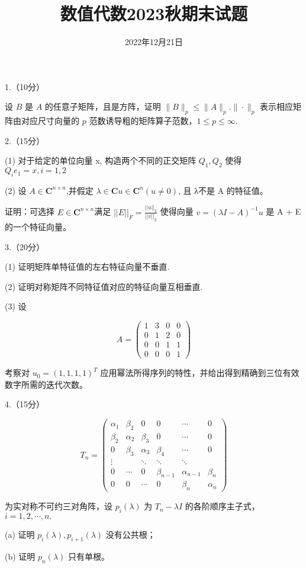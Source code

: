 \documentclass{article}
\title{数值代数2023秋期末试题}
\author{2022年12月21日}
\date{}
\begin{document}
	\maketitle
	
1.（10分）

设 $B$ 是 $A$ 的任意子矩阵，且是方阵，证明 $\|B\|_p\leq\|A\|_p.\|\cdot\|_p$ 表示相应矩阵由对应尺寸向量的 $p$ 范数诱导粗的矩阵算子范数，$1\leq p\leq\infty.$ 

2.（15分）

(1) 对于给定的单位向量 x, 构造两个不同的正交矩阵 $Q_1,Q_2$ 使得 $Q_ie_1=x,i=1,2$ 

(2) 设 $A\in\mathbf{C}^{n\times n}$,并假定 $\lambda\in\mathbf{C}u\in\mathbf{C}^n(u\neq0)$, 且 λ不是 A 的特征值。

证明：可选择 $E\in\mathbf{C}^{n\times n}$满足 $||E||_F=\frac{||u||_2}{||v||_2}$
使得向量 $v=(\lambda I-A)^{-1}u$ 是 A + E 的一个特征向量。


3.（20分）

(1) 证明矩阵单特征值的左右特征向量不垂直.

(2) 证明对称矩阵不同特征值对应的特征向量互相垂直. 

(3) 设

$$\left.A=\left(\begin{array}{cccc}1&3&0&0\\0&1&2&0\\0&0&1&1\\0&0&0&1\end{array}\right.\right)$$

考察对 $u_0=(1,1,1,1)^T$ 应用幂法所得序列的特性，并给出得到精确到三位有效数字所需的迭代次数。

4.（15分）

$$T_n=\begin{pmatrix}\alpha_1&\beta_2&0&0&\cdots&0\\\beta_2&\alpha_2&\beta_3&0&\cdots&0\\0&\beta_3&\alpha_3&\beta_4&\cdots&0\\\vdots&&\ddots&\ddots&\ddots&\\0&\cdots&0&\beta_{n-1}&\alpha_{n-1}&\beta_n\\0&0&\cdots&0&\beta_n&\alpha_n\end{pmatrix}$$

为实对称不可约三对角阵，设 $p_i(\lambda)$ 为 $T_n-\lambda I$ 的各阶顺序主子式，$i=1,2,\cdots,n.$

(a) 证明 $p_i(\lambda),p_{i+1}(\lambda)$ 没有公共根； 

(b) 证明 $p_n(\lambda)$ 只有单根。
\end{document}
